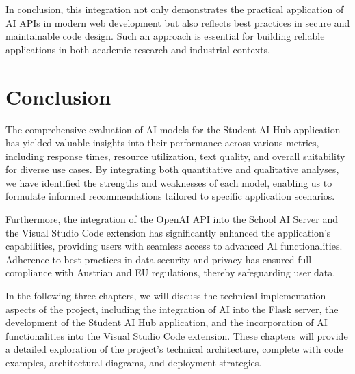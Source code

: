 In conclusion, this integration not only demonstrates the practical application of AI APIs in modern web development but also reflects best practices in secure and maintainable code design. Such an approach is essential for building reliable applications in both academic research and industrial contexts.


\section{Conclusion}

The comprehensive evaluation of AI models for the Student AI Hub application has yielded valuable insights into their performance across various metrics, including response times, resource utilization, text quality, and overall suitability for diverse use cases. By integrating both quantitative and qualitative analyses, we have identified the strengths and weaknesses of each model, enabling us to formulate informed recommendations tailored to specific application scenarios.

Furthermore, the integration of the OpenAI API into the School AI Server and the Visual Studio Code extension has significantly enhanced the application's capabilities, providing users with seamless access to advanced AI functionalities. Adherence to best practices in data security and privacy has ensured full compliance with Austrian and EU regulations, thereby safeguarding user data.

In the following three chapters, we will discuss the technical implementation aspects of the project, including the integration of AI into the Flask server, the development of the Student AI Hub application, and the incorporation of AI functionalities into the Visual Studio Code extension. These chapters will provide a detailed exploration of the project's technical architecture, complete with code examples, architectural diagrams, and deployment strategies.








